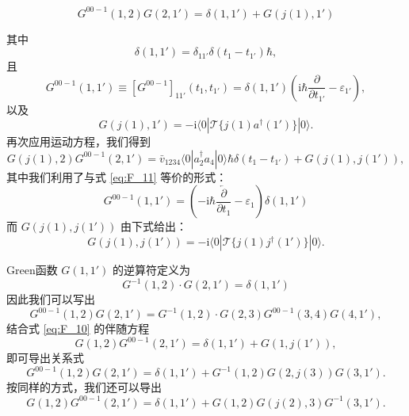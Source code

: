 \begin{equation}
G^{00-1}(1,2)G(2,1')=\delta(1,1')+G(j(1),1')\label{eq:F_10}
\end{equation}

其中
\begin{equation}
\delta(1,1')=\delta_{11'}\delta(t_{1}-t_{1'})\hbar,\label{eq:F_11}
\end{equation}
且
\[
G^{00-1}(1,1')\equiv[G^{00-1}]_{11'}(t_{1},t_{1'})=\delta(1,1')\left(\mathrm{i}\hbar\frac{\partial}{\partial t_{1'}}-\varepsilon_{1'}\right),
\]
以及
\begin{equation}
G(j(1),1')=-\mathrm{i}\langle0|\mathcal{T}\{j(1)a^{\dagger}(1')\}|0\rangle.\label{eq:F_12}
\end{equation}
再次应用运动方程，我们得到
\begin{equation}
G(j(1),2)G^{00-1}(2,1')=\bar{v}_{1234}\langle0|a^{\dagger}_{2}a_{4}|0\rangle\hbar\delta(t_{1}-t_{1'})+G(j(1),j(1')),\label{eq:F_13}
\end{equation}
其中我们利用了与式 \ref{eq:F_11} 等价的形式：
\begin{equation}
G^{00-1}(1,1')=\left(-\mathrm{i}\hbar\frac{\overleftarrow{\partial}}{\partial t_{1}}-\varepsilon_{1}\right)\delta(1,1')\label{eq:F_14}
\end{equation}
而 $G(j(1),j(1'))$ 由下式给出：
\begin{equation}
G(j(1),j(1'))=-\mathrm{i}\langle0|\mathcal{T}\{j(1)j^{\dagger}(1')\}|0\rangle.\label{eq:F_15}
\end{equation}

Green函数 $G(1,1')$ 的逆算符定义为
\begin{equation}
G^{-1}(1,2)\cdot G(2,1')=\delta(1,1')\label{eq:F_16}
\end{equation}
因此我们可以写出
\begin{equation}
G^{00-1}(1,2)G(2,1')=G^{-1}(1,2)\cdot G(2,3)G^{00-1}(3,4)G(4,1'),\label{eq:F_17}
\end{equation}
结合式 \ref{eq:F_10} 的伴随方程
\begin{equation}
G(1,2)G^{00-1}(2,1')=\delta(1,1')+G(1,j(1')),\label{eq:F_18}
\end{equation}
即可导出关系式
\begin{equation}
G^{00-1}(1,2)G(2,1')=\delta(1,1')+G^{-1}(1,2)G(2,j(3))G(3,1').\label{eq:F_19a}
\end{equation}
按同样的方式，我们还可以导出
\begin{equation}
G(1,2)G^{00-1}(2,1')=\delta(1,1')+G(1,2)G(j(2),3)G^{-1}(3,1').\label{eq:F_19b}
\end{equation}

